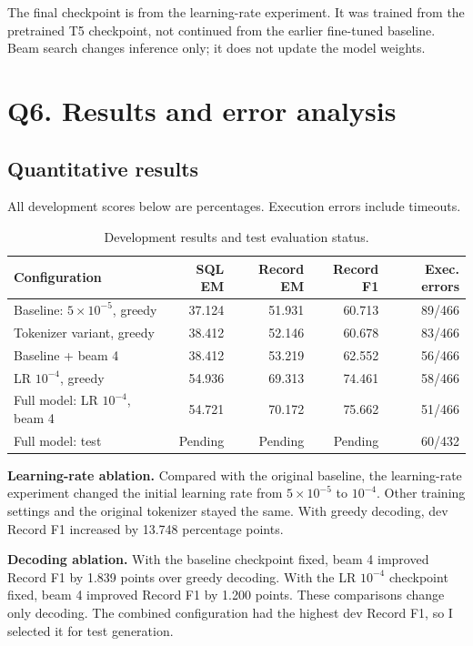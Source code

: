 \documentclass[11pt]{article}
\begin{document}
The final checkpoint is from the learning-rate experiment. It was trained from the pretrained T5 checkpoint, not continued from the earlier fine-tuned baseline. Beam search changes inference only; it does not update the model weights.

\newpage
\section{Q6. Results and error analysis}
\subsection{Quantitative results}
All development scores below are percentages. Execution errors include timeouts.
\begin{table}[h]\centering\small
\begin{tabular}{lrrrr}\toprule
Configuration & SQL EM & Record EM & Record F1 & Exec. errors\\\midrule
Baseline: $5\!\times\!10^{-5}$, greedy & 37.124 & 51.931 & 60.713 & 89/466\\
Tokenizer variant, greedy & 38.412 & 52.146 & 60.678 & 83/466\\
Baseline + beam 4 & 38.412 & 53.219 & 62.552 & 56/466\\
LR $10^{-4}$, greedy & 54.936 & 69.313 & 74.461 & 58/466\\
Full model: LR $10^{-4}$, beam 4 & 54.721 & 70.172 & 75.662 & 51/466\\\midrule
Full model: test & Pending & Pending & Pending & 60/432\\\bottomrule
\end{tabular}
\caption{Development results and test evaluation status.}
\end{table}

\textbf{Learning-rate ablation.} Compared with the original baseline, the learning-rate experiment changed the initial learning rate from $5\times10^{-5}$ to $10^{-4}$. Other training settings and the original tokenizer stayed the same. With greedy decoding, dev Record F1 increased by 13.748 percentage points.

\textbf{Decoding ablation.} With the baseline checkpoint fixed, beam 4 improved Record F1 by 1.839 points over greedy decoding. With the LR $10^{-4}$ checkpoint fixed, beam 4 improved Record F1 by 1.200 points. These comparisons change only decoding. The combined configuration had the highest dev Record F1, so I selected it for test generation.
\end{document}
